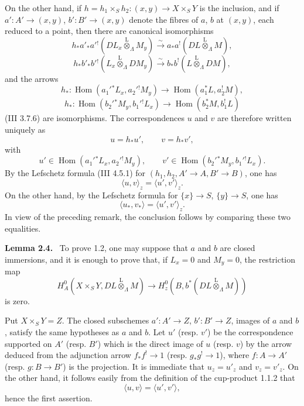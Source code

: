 \documentclass[11pt]{article}
\newenvironment{statement}[1]{\par\medskip\noindent\textbf{#1.}\ }{\par\medskip}
\DeclareMathOperator{\Hom}{Hom}
\providecommand{\lten}{\overset{\mathrm L}{\otimes}}
\begin{document}
On the other hand, if $h=h_1\times_Sh_2:(x,y)\to X\times_SY$ is the inclusion, and if $a':A'\to(x,y)$, $b':B'\to(x,y)$ denote the fibres of $a$, $b$ at $(x,y)$, each reduced to a point, then there are canonical isomorphisms
\[
h_*a'_*a'{}^!(DL_x\lten_{\Lambda}M_y)
 \xrightarrow{\sim} a_*a^!(DL\lten_{\Lambda}M),
\]
\[
h_*b'_*b'{}^!(L_x\lten_{\Lambda}DM_y)
 \xrightarrow{\sim} b_*b^!(L\lten_{\Lambda}DM),
\]
and the arrows
\[
h_*:\Hom(a_1'{}^*L_x,a_2'{}^!M_y)\to \Hom(a_1^*L,a_2^!M),
\]
\[
h_*:\Hom(b_2'{}^*M_y,b_1'{}^!L_x)\to \Hom(b_2^*M,b_1^!L)
\]
(III 3.7.6) are isomorphisms. The correspondences $u$ and $v$ are therefore written uniquely as
\[
u=h_*u',\qquad v=h_*v',
\]
with
\[
u'\in\Hom(a_1'{}^*L_x,a_2'{}^!M_y),\qquad
v'\in\Hom(b_2'{}^*M_y,b_1'{}^!L_x).
\]
By the Lefschetz formula (III 4.5.1) for $(h_1,h_2,A'\to A,B'\to B)$, one has
\[
\langle u,v\rangle_z=\langle u',v'\rangle_z .
\]
On the other hand, by the Lefschetz formula for $\{x\}\to S$, $\{y\}\to S$, one has
\[
\langle u_*,v_*\rangle=\langle u',v'\rangle_z .
\]
In view of the preceding remark, the conclusion follows by comparing these two equalities.

\begin{statement}{Lemma 2.4}
To prove 1.2, one may suppose that $a$ and $b$ are closed immersions, and it is enough to prove that, if $L_x=0$ and $M_y=0$, the restriction map
\[
H_A^0(X\times_SY,DL\lten_{\Lambda}M)
 \longrightarrow H_z^0(B,b^*(DL\lten_{\Lambda}M))
\tag{2.4.1}
\]
is zero.
\end{statement}

Put $X\times_SY=Z$. The closed subschemes $a':A'\to Z$, $b':B'\to Z$, images of $a$ and $b$, satisfy the same hypotheses as $a$ and $b$. Let $u'$ (resp. $v'$) be the correspondence supported on $A'$ (resp. $B'$) which is the direct image of $u$ (resp. $v$) by the arrow deduced from the adjunction arrow $f_*f^!\to1$ (resp. $g_*g^!\to1$), where $f:A\to A'$ (resp. $g:B\to B'$) is the projection. It is immediate that $u_z=u'_z$ and $v_z=v'_z$. On the other hand, it follows easily from the definition of the cup-product 1.1.2 that
\[
\langle u,v\rangle=\langle u',v'\rangle,
\]
hence the first assertion.
\end{document}
